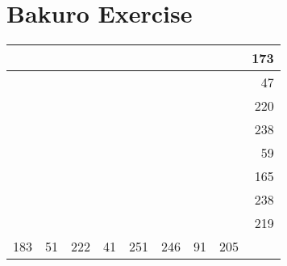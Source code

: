 \documentclass[]{article}
\begin{document}
\section{Bakuro Exercise}\begin{tabular}{rrrrrrrrr}
\hline
     &    &     &    &     &     &    &     & 173 \\ \hline
     &    &     &    &     &     &    &     &  47 \\ \hline
     &    &     &    &     &     &    &     & 220 \\ \hline
     &    &     &    &     &     &    &     & 238 \\ \hline
     &    &     &    &     &     &    &     &  59 \\ \hline
     &    &     &    &     &     &    &     & 165 \\ \hline
     &    &     &    &     &     &    &     & 238 \\ \hline
     &    &     &    &     &     &    &     & 219 \\ \hline
 183 & 51 & 222 & 41 & 251 & 246 & 91 & 205 &     \\ \hline
\hline
\end{tabular}\newpage 
\end{document}
